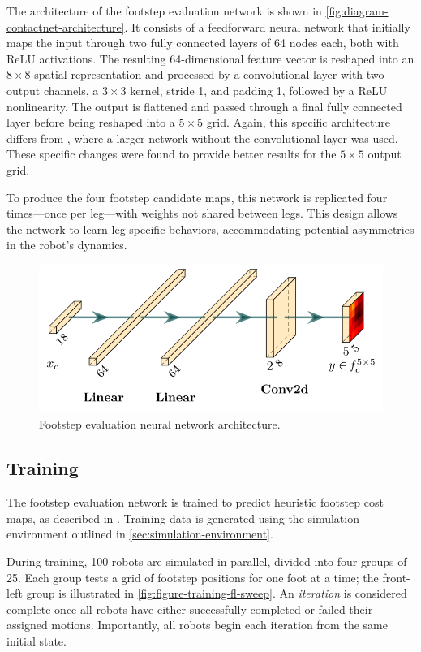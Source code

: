 The architecture of the footstep evaluation network is shown in
\autoref{fig:diagram-contactnet-architecture}. It consists of a
feedforward neural network that initially maps the input through two
fully connected layers of 64 nodes each, both with ReLU activations.
The resulting 64-dimensional feature vector is reshaped into an $8
\times 8$ spatial representation and processed by a convolutional
layer with two output channels, a $3 \times 3$ kernel, stride 1, and
padding 1, followed by a ReLU nonlinearity. The output is flattened
and passed through a final fully connected layer before being
reshaped into a $5 \times 5$ grid. Again, this specific architecture
differs from \cite{bratta_contactnet_2024}, where a larger network
without the convolutional layer was used. These specific changes were
found to provide better results for the $5 \times 5$ output grid.

To produce the four footstep candidate maps, this network is
replicated four times—once per leg—with weights not shared between
legs. This design allows the network to learn leg-specific behaviors,
accommodating potential asymmetries in the robot’s dynamics.

\begin{figure}[H]
  \centering
  \includegraphics[width=0.5\linewidth]{images/diagrams/contact-network-architecture.png}
  \caption{Footstep evaluation neural network architecture.}
  \label{fig:diagram-contactnet-architecture}
\end{figure}

\subsection{Training}
\label{subsec:contactnet-training}

The footstep evaluation network is trained to predict heuristic
footstep cost maps, as described in \cite{bratta_contactnet_2024}.
Training data is generated using the simulation environment outlined
in \autoref{sec:simulation-environment}.

During training, 100 robots are simulated in parallel, divided into
four groups of 25. Each group tests a grid of footstep positions for
one foot at a time; the front-left group is illustrated in
\autoref{fig:figure-training-fl-sweep}. An \textit{iteration} is
considered complete once all robots have either successfully
completed or failed their assigned motions. Importantly, all robots
begin each iteration from the same initial state.

